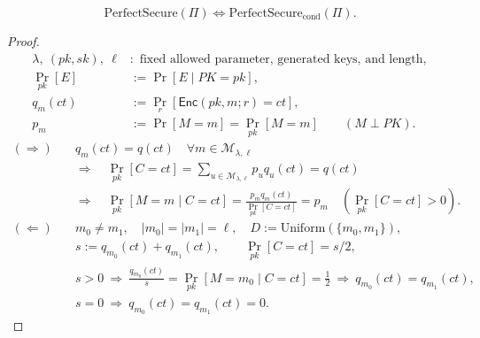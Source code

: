 \documentclass[12pt,a4paper]{article}
\begin{document}
\begin{lemma}
\[
\mathrm{PerfectSecure}(\Pi)
\iff\mathrm{PerfectSecure}_{\mathrm{cond}}(\Pi).
\]
\end{lemma}
\begin{proof}
\[
\begin{aligned}
\lambda,\ (pk,sk),\ \ell&:\text{ fixed allowed parameter, generated keys, and length},\\
\Pr_{pk}[E]&:=\Pr[E\mid PK=pk],\\
q_m(ct)&:=\Pr_r[\mathsf{Enc}(pk,m;r)=ct],\\
p_m&:=\Pr[M=m]=\Pr_{pk}[M=m]\qquad(M\perp PK).
\end{aligned}
\]
\[
\begin{aligned}
(\Longrightarrow)\quad
&q_m(ct)=q(ct)\quad\forall m\in\mathcal{M}_{\lambda,\ell}\\
&\Longrightarrow\quad
\Pr_{pk}[C=ct]=\sum_{u\in\mathcal{M}_{\lambda,\ell}}p_uq_u(ct)=q(ct)\\
&\Longrightarrow\quad
\Pr_{pk}[M=m\mid C=ct]
=\frac{p_mq_m(ct)}{\Pr_{pk}[C=ct]}=p_m
\quad(\Pr_{pk}[C=ct]>0).
\end{aligned}
\]
\[
\begin{aligned}
(\Longleftarrow)\quad
&m_0\ne m_1,\quad |m_0|=|m_1|=\ell,\quad
D:=\mathrm{Uniform}(\{m_0,m_1\}),\\
&s:=q_{m_0}(ct)+q_{m_1}(ct),\qquad \Pr_{pk}[C=ct]=s/2,\\
&s>0\ \Longrightarrow\
\frac{q_{m_0}(ct)}{s}
=\Pr_{pk}[M=m_0\mid C=ct]=\frac12
\ \Longrightarrow\ q_{m_0}(ct)=q_{m_1}(ct),\\
&s=0\ \Longrightarrow\ q_{m_0}(ct)=q_{m_1}(ct)=0.
\end{aligned}
\]
\end{proof}
\end{document}

